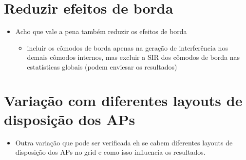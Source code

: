 \documentclass{article}
\begin{document}
\section{Reduzir efeitos de borda}

\begin{itemize}
\itemsep1pt\parskip0pt
\item
  Acho que vale a pena também reduzir os efeitos de borda

  \begin{itemize}
  \itemsep1pt\parskip0pt
  \item
    incluir os cômodos de borda apenas na geração de interferência nos
    demais cômodos internos, mas excluir a SIR dos cômodos de borda nas
    estatísticas globais (podem enviesar os resultados)
  \end{itemize}
\end{itemize}

\section{Variação com diferentes layouts de disposição dos
APs}

\begin{itemize}
\itemsep1pt\parskip0pt
\item
  Outra variação que pode ser verificada eh se cabem diferentes layouts
  de disposição dos APs no grid e como isso influencia os resultados.
\end{itemize}
\end{document}
